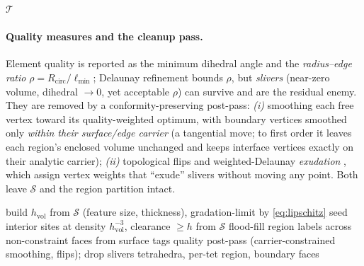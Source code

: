 \documentclass[11pt,a4paper]{article}
\numberwithin{equation}{section}
\begin{document}
\begin{algorithm}[H]
\caption{\textsc{RecoverFacets}$(\mathcal{T},\mathcal{S})$ -- boundary recovery}
\label{alg:recover}
\Return $\mathcal{T}$\;
\end{algorithm}

\paragraph{Quality measures and the cleanup pass.}
Element quality is reported as the minimum dihedral angle and the
\emph{radius--edge ratio} $\rho=R_{\text{circ}}/\ell_{\min}$; Delaunay refinement
bounds $\rho$, but \emph{slivers} (near-zero volume, dihedral $\to0$, yet
acceptable $\rho$) can survive and are the residual enemy. They are removed by a
conformity-preserving post-pass: \emph{(i)} smoothing each free vertex toward its
quality-weighted optimum, with boundary vertices smoothed only \emph{within their
surface/edge carrier} (a tangential move; to first order it leaves each region's
enclosed volume unchanged and keeps interface vertices exactly on their analytic
carrier); \emph{(ii)} topological flips and weighted-Delaunay \emph{exudation}
\cite{ChengDeyEdelsbrunner2000,TournoisAlliez2009}, which assign vertex weights
that ``exude'' slivers without moving any point. Both leave $\mathcal{S}$ and the
region partition intact.

\begin{algorithm}[H]
\caption{\textsc{MeshVolume}$(\mathcal{S},h)$}
\label{alg:vol}
build $h_{\text{vol}}$ from $\mathcal{S}$ (feature size, thickness),
   gradation-limit by \eqref{eq:lipschitz}\;
seed interior sites at density $h_{\text{vol}}^{-3}$, clearance $\ge h$ from
   $\mathcal{S}$\;
flood-fill region labels across non-constraint faces from surface tags\;
quality post-pass (carrier-constrained smoothing, flips); drop slivers\;
\Return tetrahedra, per-tet region, boundary faces\;
\end{algorithm}
\end{document}
